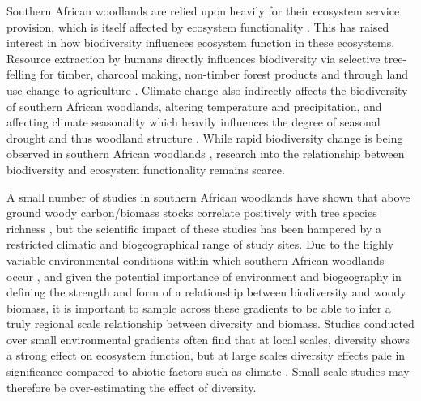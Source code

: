 \documentclass[11pt,a4paper]{article}
\begin{document}
Southern African woodlands are relied upon heavily for their ecosystem service provision, which is itself affected by ecosystem functionality \citep{Schulze1994}. This has raised interest in how biodiversity influences ecosystem function in these ecosystems. Resource extraction by humans directly influences biodiversity via selective tree-felling for timber, charcoal making, non-timber forest products and through land use change to agriculture \citep{Aleman2016, Ryan2016}. Climate change also indirectly affects the biodiversity of southern African woodlands, altering temperature and precipitation, and affecting climate seasonality which heavily influences the degree of seasonal drought and thus woodland structure \citep{Scholes2004, Eldridge2012}. While rapid biodiversity change is being observed in southern African woodlands \citep{}, research into the relationship between biodiversity and ecosystem functionality remains scarce.

A small number of studies in southern African woodlands have shown that above ground woody carbon/biomass stocks correlate positively with tree species richness \citep{McNicol2018, Shirima2015, Mutowo2012}, but the scientific impact of these studies has been hampered by a restricted climatic and biogeographical range of study sites. Due to the highly variable environmental conditions within which southern African woodlands occur \citep{Frost1996}, and given the potential importance of environment and biogeography in defining the strength and form of a relationship between biodiversity and woody biomass, it is important to sample across these gradients to be able to infer a truly regional scale relationship between diversity and biomass. Studies conducted over small environmental gradients often find that at local scales, diversity shows a strong effect on ecosystem function, but at large scales diversity effects pale in significance compared to abiotic factors such as climate \citep{Pasari2013}. Small scale studies may therefore be over-estimating the effect of diversity.
\end{document}
